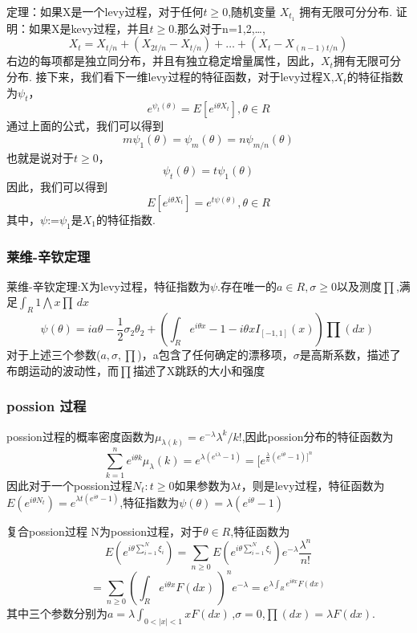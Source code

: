 \documentclass{beamer}
\begin{document}
\begin{frame}
定理：如果X是一个levy过程，对于任何$t \geq 0$,随机变量 $X_{t_1} $ 拥有无限可分分布.
证明：如果X是kevy过程，并且$t \geq 0$.那么对于n=1,2,\dots,\[ X_{t}=X_{t/n}+(X_{2t/n}-X_{t/n})+\dots+(X_{t}-X_{(n-1)t/n})\]右边的每项都是独立同分布，并且有独立稳定增量属性，因此，${X_{t}}$拥有无限可分分布.
接下来，我们看下一维levy过程的特征函数，对于levy过程X,$X_{t}$的特征指数为$\psi_{t}$，\[e^{\psi_{t}(\theta)}=E[e^{i \theta X_{t}}] ,\theta \in R \]通过上面的公式，我们可以得到\[ m\psi_{1}(\theta)=\psi_{m}(\theta)=n\psi_{m/n}(\theta)\] 也就是说对于$t \geq 0$，\[\psi_{t}(\theta)=t\psi_{1}(\theta)\]因此，我们可以得到\[E[e^{i\theta X_{t}}]=e^{t\psi(\theta)}, \theta \in R\]其中，$\psi$:=$\psi_{1}$是$X_{1}$的特征指数.

\end{frame}
\begin{frame}
\frametitle{莱维-辛钦定理}
莱维-辛钦定理:X为levy过程，特征指数为$\psi$.存在唯一的$a \in R,\sigma \geq 0$以及测度$\prod$,满足$\int_R 1 \bigwedge x \prod \,dx$  \[\psi(\theta)=ia\theta-\frac{1}{2}\sigma_{2}\theta_{2}+(\int_R e^{i\theta x}-1-i\theta xI_{[-1,1]}(x))\prod(dx) \, \]对于上述三个参数($a,\sigma,\prod$)，a包含了任何确定的漂移项，$\sigma$是高斯系数，描述了布朗运动的波动性，而$\prod$描述了X跳跃的大小和强度
\end{frame}

\begin{frame}
\frametitle{possion 过程}
possion过程的概率密度函数为$\mu_{\lambda({k})}=e^{-\lambda}\lambda^{k}/k!$,因此possion分布的特征函数为\[\sum_{k=1}^{n}e^{i\theta k}\mu_{\lambda}({k})=e^{\lambda(e^{i\lambda}-1)}=[e^{\frac{\lambda}{n}(e^{i\theta}-1)]^{n}} \]因此对于一个possion过程{$N_{t}:t \geq 0$}如果参数为$\lambda t$，则是levy过程，特征函数为$E(e^{i\theta N_{t}})=e^{\lambda t(e^{i\theta}-1)}$,特征指数为$\psi(\theta)=\lambda(e^{i\theta}-1)$
\end{frame}

\begin{frame}
复合possion过程\newline\newline
N为possion过程，对于$\theta \in R $,特征函数为\[E(e^{i\theta\sum_{i=1}^{N}\xi_{i}})=\sum_{n\geq0}E(e^{i\theta\sum_{i=1}^{N}\xi_{i}})e^{-\lambda}\frac{\lambda^{n}}{n!}\]
\newline
\[=\sum_{n\geq0}(\int_R e^{i\theta x}F(dx)\,)^{n}e^{-\lambda}=e^{\lambda\int_R e^{i\theta x}F(dx)\,} \]其中三个参数分别为$a=\lambda\int_{0<|x|<1}xF(dx) \,$,$\sigma=0$,$\prod(dx)=\lambda F(dx)$.

\end{frame}
\end{document}
